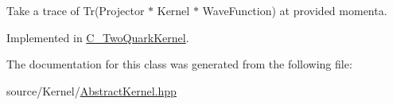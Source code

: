 Take a trace of Tr(\-Projector $\ast$ Kernel $\ast$ Wave\-Function) at provided momenta. 



Implemented in \hyperlink{class_c___two_quark_kernel_a2ce4048e66e3a514657f3f7c03e96447}{C\-\_\-\-Two\-Quark\-Kernel}.



The documentation for this class was generated from the following file\-:\begin{DoxyCompactItemize}
\item 
source/\-Kernel/\hyperlink{_abstract_kernel_8hpp}{Abstract\-Kernel.\-hpp}\end{DoxyCompactItemize}
